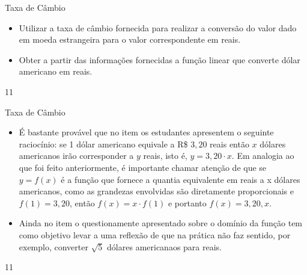 \needspace{.2\textheight}
\def\currentcolor{session2}
\begin{objectives}{Taxa de Câmbio}
{
\begin{itemize}
\item Utilizar a taxa de câmbio fornecida para realizar a conversão do valor dado em moeda estrangeira para o valor correspondente em reais.

\item Obter a partir das informações fornecidas a função linear que converte dólar americano em reais.

\end{itemize}
}{1}{1}
\end{objectives}
\begin{sugestions}{Taxa de Câmbio}
{
\begin{itemize}
\item É bastante provável que no item  os estudantes apresentem o seguinte raciocínio: se 1 dólar americano equivale a R\$ $3{,}20$ reais então $x$ dólares americanos irão corresponder a $y$ reais, isto é, $y=3,20\cdot x$. Em analogia ao que foi feito anteriormente, é importante chamar atenção de que se $y=f(x)$ é a função que fornece a quantia equivalente em reais a x dólares americanos, como as grandezas envolvidas são diretamente proporcionais e $f(1)=3{,}20$, então $f(x)=x\cdot f(1)$ e portanto $f(x)=3{,}20{,}x$.

\item Ainda no item  o questionamente apresentado sobre o domínio da função tem como objetivo levar a uma reflexão de que na prática não faz sentido, por exemplo, converter $\sqrt{5}$ dólares americanaos para reais.
\end{itemize}
}{1}{1}
\end{sugestions}
